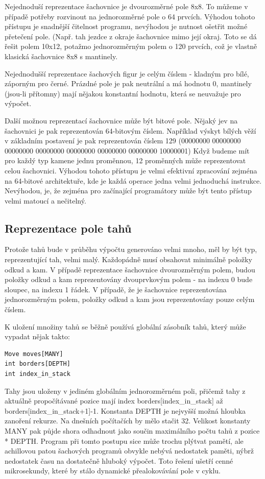 \documentclass[11pt, titlepage]{article}
\begin{document}
Nejednoduší reprezentace šachovnice je dvourozměrné pole 8x8. To můžeme v případě potřeby rozvinout na jednorozměrné pole o 64 prvcích. Výhodou tohoto přístupu je snadnější čitelnost programu, nevýhodou je nutnost ošetřit možné přetečení pole. (Např. tah jezdce z okraje šachovnice mimo její okraj. Toto se dá řešit polem 10x12, potažmo jednorozměrným polem o 120 prvcích, což je vlastně klasická šachovnice 8x8 s mantinely.

Nejednodušší reprezentace šachových figur je celým číslem - kladným pro bílé, záporným pro černé. Prázdné pole je pak neutrální a má hodnotu 0, mantinely (jsou-li přítomny) mají nějakou konstantní hodnotu, která se neuvažuje pro výpočet.

Další možnou reprezentací šachovnice může být bitové pole. Nějaký jev na šachovnici je pak reprezentován 64-bitovým číslem. Například výskyt bílých věží v základním postavení je pak reprezentován číslem 129 (00000000 00000000 00000000 00000000 00000000 00000000 00000000 10000001) Když budeme mít pro každý typ kamene jednu proměnnou, 12 proměnných může reprezentovat celou šachovnici. Výhodou tohoto přístupu je velmi efektivní zpracování zejména na 64-bitové architektuře, kde je každá operace jedna velmi jednoduchá instrukce. Nevýhodou, je, že zejména pro začínající programátory může být tento přístup velmi matoucí a nečitelný.

\subsection{Reprezentace pole tahů}

Protože tahů bude v průběhu výpočtu generováno velmi mnoho, měl by být typ, reprezentující tah, velmi malý. Každopádně musí obsahovat minimálně položky odkud a kam. V případě reprezentace šachovnice dvourozměrným polem, budou položky odkud a kam reprezentovány dvouprvkovým polem - na indexu 0 bude sloupec, na indexu 1 řádek. V případě, že je šachovnice reprezentována jednorozměrným polem, položky odkud a kam jsou reprezentovány pouze celým číslem.

K uložení množiny tahů se běžně používá globální zásobník tahů, který může vypadat nějak takto:
\begin{verbatim}
Move moves[MANY]
int borders[DEPTH]
int index_in_stack
\end{verbatim}

Tahy jsou uloženy v jediném globálním jednorozměrném poli, přičemž tahy z aktuálně propočítávané pozice mají index borders[index\_in\_stack] až borders[index\_in\_stack+1]-1. Konstanta DEPTH je nejvyšší možná hloubka zanoření rekurze. Na dnešních počítačích by mělo stačit 32. Velikost konstanty MANY pak půjde shora odhadnout jako součin maximálního počtu tahů z pozice * DEPTH. Program při tomto postupu sice může trochu plýtvat pamětí, ale achillovou patou šachových programů obvykle nebývá nedostatek paměti, nýbrž nedostatek času na dostatečně hluboký výpočet. Toto řešení ušetří cenné mikrosekundy, které by stálo dynamické přealokovávání pole v cyklu.
\end{document}
